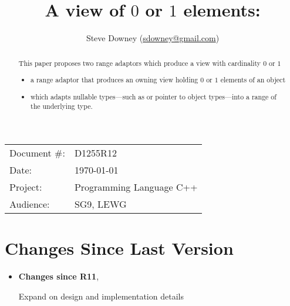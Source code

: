 \documentclass[a4paper,10pt,oneside,openany,final,article]{memoir}
\begin{document}
\title{A view of $0$ or $1$ elements: }
\author{
Steve Downey \small(\href{mailto:sdowney@gmail.com}{sdowney@gmail.com}) \\
}
\date{} %
\maketitle

\begin{flushright}
\begin{tabular}{ll}
  Document \#: & D1255R12 \\
  Date: & \today \\
  Project: & Programming Language C++ \\
  Audience: & SG9, LEWG
\end{tabular}
\end{flushright}

\begin{abstract}
  This paper proposes two range adaptors which produce a view with cardinality $0$ or $1$
  \begin{itemize}
  \item
     a range adaptor that produces an owning view holding $0$ or $1$ elements of an object
  \item
     which adapts nullable types---such as  or pointer to object types---into a range of the underlying type.
  \end{itemize}
\end{abstract}

\tableofcontents*

\chapter*{Changes Since Last Version}

\begin{itemize}
\item \textbf{Changes since R11},
  \begin{itemize}
    Expand on design and implementation details
  \end{itemize}
\end{itemize}
\end{document}

